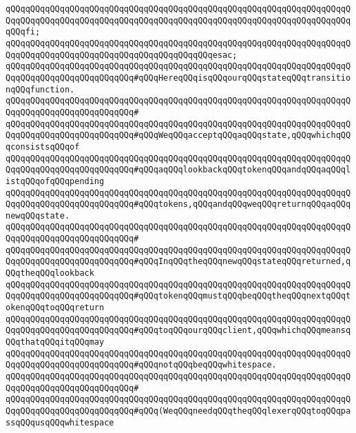 \verb|qQQqqQQqqQQqqQQqqQQqqQQqqQQqqQQqqQQqqQQqqQQqqQQqqQQqqQQqqQQqqQQqqQQqqQQqqQQqqQQqqQQqqQQqqQQqqQQqqQQqqQQqqQQqqQQqqQQqqQQqqQQqqQQqqQQqqQQqqQQqqQQqfi;|\newline
\verb|qQQqqQQqqQQqqQQqqQQqqQQqqQQqqQQqqQQqqQQqqQQqqQQqqQQqqQQqqQQqqQQqqQQqqQQqqQQqqQQqqQQqqQQqqQQqqQQqqQQqqQQqqQQqqQQqesac;|\newline
\newline
\verb|qQQqqQQqqQQqqQQqqQQqqQQqqQQqqQQqqQQqqQQqqQQqqQQqqQQqqQQqqQQqqQQqqQQqqQQqqQQqqQQqqQQqqQQqqQQqqQQq#qQQqHereqQQqisqQQqourqQQqstateqQQqtransitionqQQqfunction.|\newline
\verb|qQQqqQQqqQQqqQQqqQQqqQQqqQQqqQQqqQQqqQQqqQQqqQQqqQQqqQQqqQQqqQQqqQQqqQQqqQQqqQQqqQQqqQQqqQQqqQQq#|\newline
\verb|qQQqqQQqqQQqqQQqqQQqqQQqqQQqqQQqqQQqqQQqqQQqqQQqqQQqqQQqqQQqqQQqqQQqqQQqqQQqqQQqqQQqqQQqqQQqqQQq#qQQqWeqQQqacceptqQQqaqQQqstate,qQQqwhichqQQqconsistsqQQqof|\newline
\verb|qQQqqQQqqQQqqQQqqQQqqQQqqQQqqQQqqQQqqQQqqQQqqQQqqQQqqQQqqQQqqQQqqQQqqQQqqQQqqQQqqQQqqQQqqQQqqQQq#qQQqaqQQqlookbackqQQqtokenqQQqandqQQqaqQQqlistqQQqofqQQqpending|\newline
\verb|qQQqqQQqqQQqqQQqqQQqqQQqqQQqqQQqqQQqqQQqqQQqqQQqqQQqqQQqqQQqqQQqqQQqqQQqqQQqqQQqqQQqqQQqqQQqqQQq#qQQqtokens,qQQqandqQQqweqQQqreturnqQQqaqQQqnewqQQqstate.|\newline
\verb|qQQqqQQqqQQqqQQqqQQqqQQqqQQqqQQqqQQqqQQqqQQqqQQqqQQqqQQqqQQqqQQqqQQqqQQqqQQqqQQqqQQqqQQqqQQqqQQq#|\newline
\verb|qQQqqQQqqQQqqQQqqQQqqQQqqQQqqQQqqQQqqQQqqQQqqQQqqQQqqQQqqQQqqQQqqQQqqQQqqQQqqQQqqQQqqQQqqQQqqQQq#qQQqInqQQqtheqQQqnewqQQqstateqQQqreturned,qQQqtheqQQqlookback|\newline
\verb|qQQqqQQqqQQqqQQqqQQqqQQqqQQqqQQqqQQqqQQqqQQqqQQqqQQqqQQqqQQqqQQqqQQqqQQqqQQqqQQqqQQqqQQqqQQqqQQq#qQQqtokenqQQqmustqQQqbeqQQqtheqQQqnextqQQqtokenqQQqtoqQQqreturn|\newline
\verb|qQQqqQQqqQQqqQQqqQQqqQQqqQQqqQQqqQQqqQQqqQQqqQQqqQQqqQQqqQQqqQQqqQQqqQQqqQQqqQQqqQQqqQQqqQQqqQQq#qQQqtoqQQqourqQQqclient,qQQqwhichqQQqmeansqQQqthatqQQqitqQQqmay|\newline
\verb|qQQqqQQqqQQqqQQqqQQqqQQqqQQqqQQqqQQqqQQqqQQqqQQqqQQqqQQqqQQqqQQqqQQqqQQqqQQqqQQqqQQqqQQqqQQqqQQq#qQQqnotqQQqbeqQQqwhitespace.|\newline
\verb|qQQqqQQqqQQqqQQqqQQqqQQqqQQqqQQqqQQqqQQqqQQqqQQqqQQqqQQqqQQqqQQqqQQqqQQqqQQqqQQqqQQqqQQqqQQqqQQq#|\newline
\verb|qQQqqQQqqQQqqQQqqQQqqQQqqQQqqQQqqQQqqQQqqQQqqQQqqQQqqQQqqQQqqQQqqQQqqQQqqQQqqQQqqQQqqQQqqQQqqQQq#qQQq(WeqQQqneedqQQqtheqQQqlexerqQQqtoqQQqpassqQQqusqQQqwhitespace|\newline
